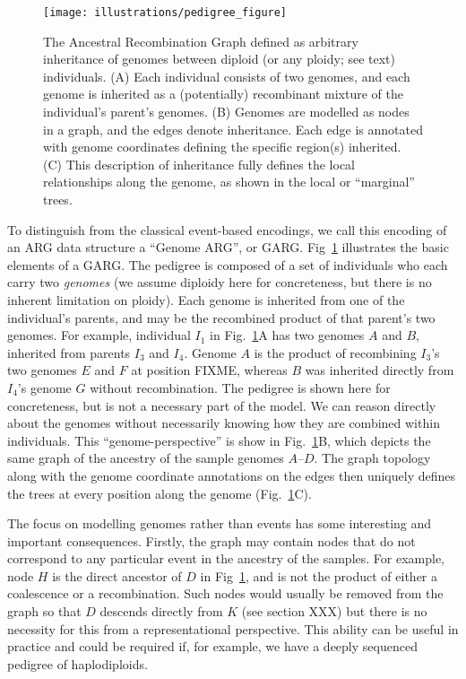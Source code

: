 \documentclass{article}
\begin{document}
\begin{figure}
\begin{center}
    \texttt{[image: illustrations/pedigree\_figure]}
\end{center}
\caption{\label{fig-pedigree-and-arg}
The Ancestral Recombination Graph defined as arbitrary inheritance
of genomes between diploid (or any ploidy; see text) individuals.
(A) Each individual consists of two genomes, and each genome is
inherited as a (potentially) recombinant mixture of the individual's parent's
genomes. (B) Genomes are modelled as nodes in a graph, and the edges
denote inheritance. Each edge is annotated with genome coordinates
defining the specific region(s) inherited.
(C) This description of inheritance fully defines the
local relationships along the genome, as shown in the local
or ``marginal'' trees.
}
\end{figure}

To distinguish from the classical event-based encodings,
we call this encoding of an ARG data
structure a ``Genome ARG'', or GARG.
Fig~\ref{fig-pedigree-and-arg} illustrates the basic elements of a GARG.
The pedigree is composed of a set of individuals who each carry
two \emph{genomes} (we assume diploidy here for concreteness, but there
is no inherent limitation on ploidy).
Each genome is inherited from one of the individual's parents, and may
be the recombined product of that parent's two genomes.
For example, individual $I_1$ in Fig.~\ref{fig-pedigree-and-arg}A
has two genomes $A$ and $B$,
inherited from parents $I_3$ and $I_4$. Genome $A$ is the product of
recombining $I_3$'s two genomes $E$ and $F$ at position FIXME,
whereas $B$ was inherited directly from $I_4$'s genome $G$ without
recombination. The pedigree is shown here for concreteness, but
is not a necessary part of the model. We can reason directly about the
genomes without necessarily knowing how they are combined within
individuals. This ``genome-perspective'' is show in
Fig.~\ref{fig-pedigree-and-arg}B, which depicts the same graph
of the ancestry of the sample genomes $A$--$D$. The graph
topology along with the genome coordinate annotations on the
edges then uniquely defines the trees at every position
along the genome (Fig.~\ref{fig-pedigree-and-arg}C).

The focus on modelling genomes rather than events has some interesting
and important consequences. Firstly, the graph may contain nodes that
do not correspond to any particular event in the ancestry of the
samples. For example, node $H$ is the direct ancestor of $D$ in
Fig~\ref{fig-pedigree-and-arg}, and is not the product of either a
coalescence or a recombination. Such nodes would usually be removed
from the graph so that $D$ descends directly from $K$ (see section XXX)
but there is no necessity for this from a representational perspective.
This ability can be useful in practice and could be required if,
for example, we have a deeply sequenced pedigree of
haplodiploids. %
\end{document}
